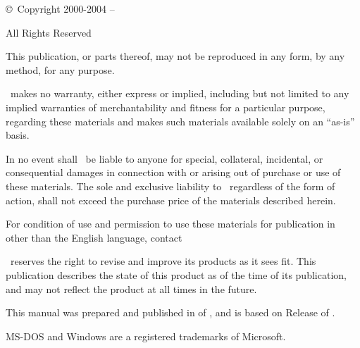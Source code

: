 \vspace*{6cm}
\begin{center}
 \copyright\ Copyright 2000-2004 --\pubyear\ \company
\end{center}

\begin{center}
 All Rights Reserved
\end{center}

This publication, or parts thereof, may not be reproduced in any form, by any
method, for any purpose.

\company\ makes no warranty, either express or implied, including but not
limited to any implied warranties of merchantability and fitness for a
particular purpose, regarding these materials and makes such materials
available solely on an ``as-is'' basis.

In no event shall \company\ be liable to anyone for special, collateral,
incidental, or consequential damages in connection with or arising out of
purchase or use of these materials.  The sole and exclusive liability to
\company\ regardless of the form of action, shall not exceed the purchase
price of the materials described herein.

For condition of use and permission to use these materials for publication in
other than the English language, contact \company

\company\ reserves the right to revise and improve its products as it sees
fit.  This publication describes the state of this product as of the time of
its publication, and may not reflect the product at all times in the future.

This manual was prepared and published in \pubmonth of \pubyear, and is based
on Release \levelno of \prog.

MS-DOS and Windows are a registered trademarks of Microsoft.
\clearpage
\tableofcontents
